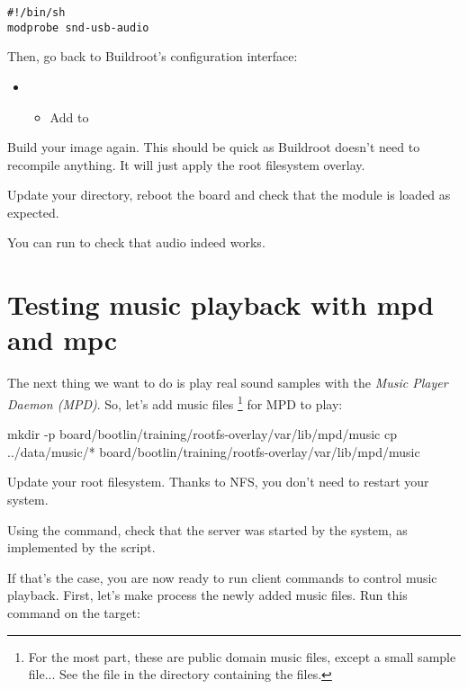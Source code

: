 \begin{verbatim}
#!/bin/sh
modprobe snd-usb-audio
\end{verbatim}

Then, go back to Buildroot's configuration interface:
\begin{itemize}
\item {}
  \begin{itemize}
  \item Add  to
  \end{itemize}
\end{itemize}

Build your image again. This should be quick as Buildroot doesn't need
to recompile anything. It will just apply the root filesystem overlay.

Update your  directory, reboot the board and check
that the  module is loaded as expected.

You can run  to check that audio indeed works.

\section{Testing music playback with mpd and mpc}

The next thing we want to do is play real sound samples with
the {\em Music Player Daemon (MPD)}. So, let's add music files
\footnote{For the most part, these are public domain
music files, except a small sample file... See the 
file in the directory containing the files.}
for MPD to play:

\begin{bashinput}
mkdir -p board/bootlin/training/rootfs-overlay/var/lib/mpd/music
cp ../data/music/* board/bootlin/training/rootfs-overlay/var/lib/mpd/music
\end{bashinput}

Update your root filesystem. Thanks to NFS, you don't need to restart
your system.

Using the  command, check that the  server
was started by the system, as implemented by the
 script.

If that's the case, you are now ready to run  client commands
to control music playback. First, let's make  process the
newly added music files. Run this command on the target:

